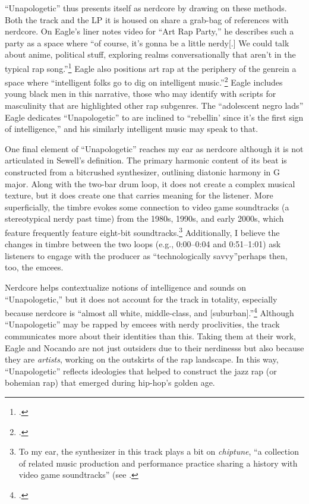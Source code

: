``Unapologetic'' thus presents itself as nerdcore by drawing on these methods. Both the track and the
LP it is housed on share a grab-bag of references with nerdcore. On Eagle's liner notes video for ``Art
Rap Party,'' he describes such a party as a space where ``of course, it's gonna be a little nerdy[.]
\textellipsis We could talk about anime, \textellipsis political stuff, exploring realms conversationally
that aren't in the typical rap song.''\footnote{
    \cite{openmikeeagleVideoLinerNotes2010}.}
Eagle also positions art rap at the periphery of the genre\textemdash in a space where ``intelligent
folks go to dig on intelligent music.''\footnote{
    \cite{openmikeeagleVideoLinerNotes2010}.} 
Eagle includes young black men in this narrative, those who may identify with scripts for masculinity
that are highlighted other rap subgenres. The ``adolescent negro lads'' Eagle dedicates ``Unapologetic''
to  are inclined  to ``rebellin' since it's the first sign of intelligence,'' and his similarly intelligent
music may speak to that.

One final element of ``Unapologetic'' reaches my ear as nerdcore although it is not articulated in Sewell's
definition. The primary harmonic content of its beat is constructed from a bitcrushed synthesizer, outlining
diatonic harmony in G major. Along with the two-bar drum loop, it does not create a complex musical texture,
but it does create one that carries meaning for the listener. More superficially, the timbre evokes some 
connection to video game soundtracks (a stereotypical nerdy past time) from the 1980s, 1990s, and early 
2000s, which feature frequently feature eight-bit soundtracks.\footnote{
    To my ear, the synthesizer in this track plays a bit on \emph{chiptune}, ``a collection of related
    music production and performance practice sharing a history with video game soundtracks'' (see
    \cite{kevindriscollEndlessLoopBrief2009}.}
Additionally, I believe the changes in timbre between  the two loops (e.g., 0:00--0:04 and 0:51--1:01) ask
listeners to engage with the producer as ``technologically savvy''\textemdash perhaps then, too, the emcees.

Nerdcore helps contextualize notions of intelligence and sounds on ``Unapologetic,'' but it does not account
for the track in totality, especially because nerdcore is ``almost all white, middle-class, and 
[suburban].''\footnote{
    \autocite[223]{amandasewellNerdcoreHiphop2015}.} 
Although ``Unapologetic'' may be rapped by emcees with nerdy proclivities, the track communicates more
about their identities than this. Taking them at their work, Eagle and Nocando are not just outsiders 
due to their nerdinesss but also because they are \emph{artists}, working on the outskirts of the rap
landscape.  In this way, ``Unapologetic'' reflects ideologies that helped to construct the jazz rap 
(or bohemian rap) that emerged during hip-hop's golden age.

